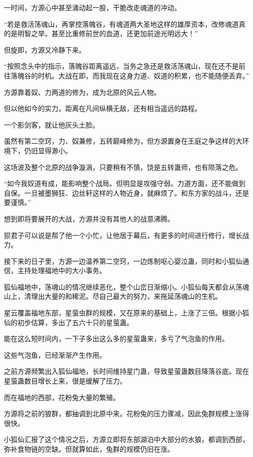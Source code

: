 \begin{this_body}
一时间，方源心中甚至涌动起一股，干脆改走魂道的冲动。

“若是救活荡魂山，再掌控落魄谷，有魂道两大圣地这样的雄厚资本，改修魂道真的是明智之举。甚至比重修前世的血道，还更加前途光明远大！”

但旋即，方源又冷静下来。

“按照念头中的指示，落魄谷距离遥远，当务之急还是救活荡魂山，现在还不是前往落魄谷的时机。大战在即，而我现在这身力道、奴道的积累，也不能随便丢弃。”

方源靠着奴、力两道的修为，成为北原的风云人物。

但以他如今的实力，距离在凡间纵横无敌，还有相当遥远的路程。

一个影剑客，就让他灰头土脸。

虽然有第二空窍，力、奴兼修，五转巅峰修为，但方源置身在王庭之争这样的大环境下，仍旧显得渺小。

这场波及整个北原的战争漩涡，只要稍有不慎，饶是五转蛊师，也有陨落之危。

“如今我奴道有成，能影响整个战局。但明显是攻强守弱。力道方面，还不能做到自保。一旦被墨狮狂、边丝轩这样的人物近身，就麻烦了。和东方家的战斗，还是要谨慎。”

想到即将要展开的大战，方源并没有其他人的战意沸腾。

狈君子可以说是帮了他一个小忙，让他居于幕后，有更多的时间进行修行，增长战力。

接下来的日子里，方源一边温养第二空窍，一边炼制呕心婴泣蛊，同时和小狐仙通信，主持处理福地中的大小事务。

狐仙福地中，荡魂山的情况继续恶化，整个山峦日渐缩小。小狐仙每天都会从荡魂山上，清理出大量的和稀泥。尽自己最大的努力，来拖延荡魂山的生机。

星云覆盖福地东部，星萤虫群的规模，又在原来的基础上，上涨了三倍。根据小狐仙的初步估算，多出了五六十只的星萤蛊。

能在这么短时间内，一下子多出这么多的星萤蛊来，多亏了气泡鱼的作用。

这些气泡鱼，已经渐渐产生作用。

之前方源频繁出入狐仙福地，长时间维持星门蛊，导致星萤蛊数目降落谷底。现在星萤蛊数目增长上来，很是缓解了压力。

而在福地的西部，花粉兔大量的繁殖。

方源将之前的狼群，都抽调到北原中来。花粉兔的压力骤减，因此兔群规模上涨得很快。

小狐仙汇报了这个情况之后，方源立即将东部湖泊中大部分的水狼，都调到西部，弥补食物链的空缺。但就算如此，兔群的规模仍旧在涨。


\end{this_body}
